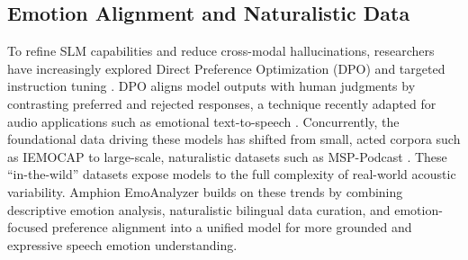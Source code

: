 \subsection{Emotion Alignment and Naturalistic Data}

To refine SLM capabilities and reduce cross-modal hallucinations, researchers have increasingly explored Direct Preference Optimization (DPO) and targeted instruction tuning \cite{DPO}. DPO aligns model outputs with human judgments by contrasting preferred and rejected responses, a technique recently adapted for audio applications such as emotional text-to-speech \cite{gao2024emodpo}. Concurrently, the foundational data driving these models has shifted from small, acted corpora such as IEMOCAP \cite{IEMOCAP} to large-scale, naturalistic datasets such as MSP-Podcast \cite{MSP-Podcast}. These ``in-the-wild'' datasets expose models to the full complexity of real-world acoustic variability. Amphion EmoAnalyzer builds on these trends by combining descriptive emotion analysis, naturalistic bilingual data curation, and emotion-focused preference alignment into a unified model for more grounded and expressive speech emotion understanding.
